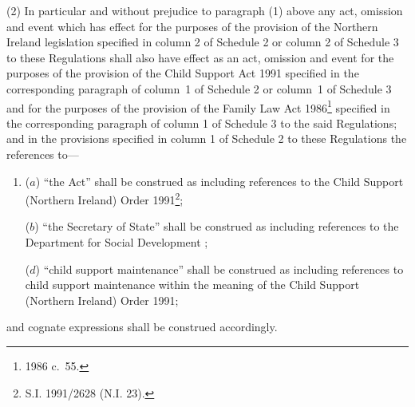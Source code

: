 \documentclass[12pt,a4paper]{article}
\begin{document}
(2) In particular and without prejudice to paragraph (1) above any act, omission and event which has effect for the purposes of the provision of the Northern Ireland legislation specified in column 2 of Schedule 2 
or column 2 of Schedule 3  %
to these Regulations shall also have effect as an act, omission and event for the purposes of the provision of the Child Support Act 1991 specified in the corresponding paragraph of column~1 of Schedule 2 
or column~1 of Schedule 3 and for the purposes of the provision of the Family Law Act 1986\footnote{1986 c.\ 55.} specified in the corresponding paragraph of column 1 of Schedule 3  %
to the said Regulations; and in the provisions specified in column 1 of Schedule 2 to these Regulations the references to—
\begin{enumerate}\item[]
($a$) “the Act” shall be construed as including references to the Child Support (Northern Ireland) Order 1991\footnote{\frenchspacing S.I. 1991/2628 (N.I. 23).};

($b$) “the Secretary of State” shall be construed as including references to the Department 
for Social Development%
;


($d$) “child support maintenance” shall be construed as including references to child support maintenance within the meaning of the Child Support (Northern Ireland) Order 1991;
\end{enumerate}
and cognate expressions shall be construed accordingly.

\end{document}
